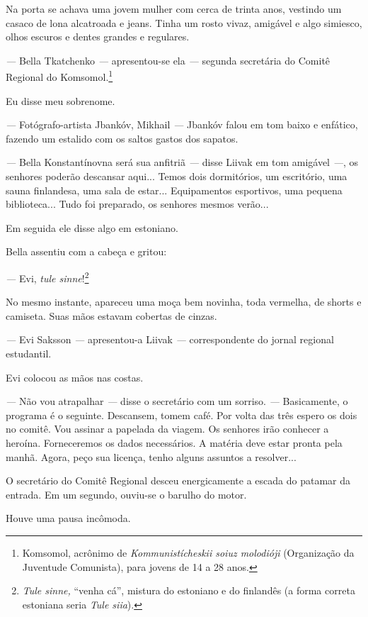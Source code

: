 Na porta se achava uma jovem mulher com cerca de trinta anos, vestindo
um casaco de lona alcatroada e jeans. Tinha um rosto vivaz, amigável e
algo simiesco, olhos escuros e dentes grandes e regulares.

\emph{---} Bella Tkatchenko \emph{---} apresentou-se ela \emph{---}
segunda secretária do Comitê Regional do Komsomol.\footnote{Komsomol,
  acrônimo de \emph{Kommunistícheskii soiuz molodióji} (Organização da
  Juventude Comunista), para jovens de 14 a 28 anos.}

Eu disse meu sobrenome.

\emph{---} Fotógrafo-artista Jbankóv, Mikhail \emph{---} Jbankóv falou
em tom baixo e enfático, fazendo um estalido com os saltos gastos dos
sapatos.

\emph{---} Bella Konstantínovna será sua anfitriã \emph{---} disse
Liivak em tom amigável \emph{---}, os senhores poderão descansar aqui...
Temos dois dormitórios, um escritório, uma sauna finlandesa, uma sala de
estar... Equipamentos esportivos, uma pequena biblioteca... Tudo foi
preparado, os senhores mesmos verão...

Em seguida ele disse algo em estoniano.

Bella assentiu com a cabeça e gritou:

\emph{---} Evi, \emph{tule sinne}!\footnote{\emph{Tule sinne,} ``venha
  cá'', mistura do estoniano e do finlandês (a forma correta estoniana
  seria \emph{Tule siia}).}

No mesmo instante, apareceu uma moça bem novinha, toda vermelha, de
shorts e camiseta. Suas mãos estavam cobertas de cinzas.

\emph{---} Evi Saksson \emph{---} apresentou-a Liivak \emph{---}
correspondente do jornal regional estudantil.

Evi colocou as mãos nas costas.

\emph{---} Não vou atrapalhar \emph{---} disse o secretário com um
sorriso. \emph{---} Basicamente, o programa é o seguinte. Descansem,
tomem café. Por volta das três espero os dois no comitê. Vou assinar a
papelada da viagem. Os senhores irão conhecer a heroína. Forneceremos os
dados necessários. A matéria deve estar pronta pela manhã. Agora, peço
sua licença, tenho alguns assuntos a resolver...

O secretário do Comitê Regional desceu energicamente a escada do patamar
da entrada. Em um segundo, ouviu-se o barulho do motor.

Houve uma pausa incômoda.

